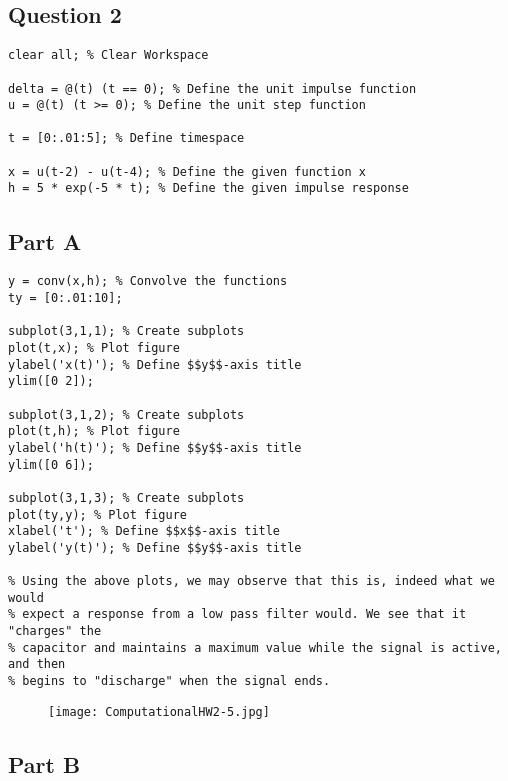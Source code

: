 \documentclass[10pt]{article}
\begin{document}
{}
\subsection*{Question 2}

\begin{lstlisting}
clear all; % Clear Workspace

delta = @(t) (t == 0); % Define the unit impulse function
u = @(t) (t >= 0); % Define the unit step function

t = [0:.01:5]; % Define timespace

x = u(t-2) - u(t-4); % Define the given function x
h = 5 * exp(-5 * t); % Define the given impulse response
\end{lstlisting}


{}
\subsection*{Part A}

\begin{lstlisting}
y = conv(x,h); % Convolve the functions
ty = [0:.01:10];

subplot(3,1,1); % Create subplots
plot(t,x); % Plot figure
ylabel('x(t)'); % Define $$y$$-axis title
ylim([0 2]);

subplot(3,1,2); % Create subplots
plot(t,h); % Plot figure
ylabel('h(t)'); % Define $$y$$-axis title
ylim([0 6]);

subplot(3,1,3); % Create subplots
plot(ty,y); % Plot figure
xlabel('t'); % Define $$x$$-axis title
ylabel('y(t)'); % Define $$y$$-axis title

% Using the above plots, we may observe that this is, indeed what we would
% expect a response from a low pass filter would. We see that it "charges" the
% capacitor and maintains a maximum value while the signal is active, and then
% begins to "discharge" when the signal ends.
\end{lstlisting}
\begin{figure}[!ht]
\texttt{[image: ComputationalHW2-5.jpg]}
\end{figure}


{}
\subsection*{Part B}
\end{document}
